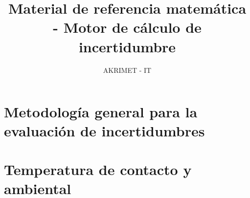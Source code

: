 \documentclass[12pt]{article}
\title{Material de referencia matemática - Motor de cálculo de incertidumbre}
\author{AKRIMET - IT}
\begin{document}
\maketitle



\section{Metodología general para la evaluación de incertidumbres}



\section{Temperatura de contacto y ambiental}\label{sec:temperatura}



\printbibliography
\end{document}
